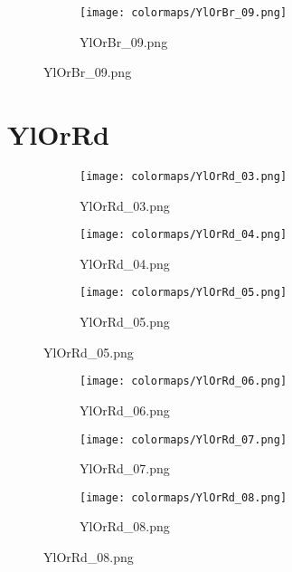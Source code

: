 \documentclass{article}%
\begin{document}
%
\hspace{1cm}\hfill%


\begin{figure}[h!]%
\begin{subfigure}[b]{0.3\linewidth}%
\texttt{[image: colormaps/YlOrBr\_09.png]}%
\caption{YlOrBr\_09.png}%
\end{subfigure}%
\end{figure}

%
\newpage%
\section{YlOrRd}%
\label{sec:YlOrRd}%
\hspace{1cm}\hfill%
\hspace{1cm}\hfill%
\hspace{1cm}\hfill%


\begin{figure}[h!]%
\begin{subfigure}[b]{0.3\linewidth}%
\texttt{[image: colormaps/YlOrRd\_03.png]}%
\caption{YlOrRd\_03.png}%
\end{subfigure}%
\begin{subfigure}[b]{0.3\linewidth}%
\texttt{[image: colormaps/YlOrRd\_04.png]}%
\caption{YlOrRd\_04.png}%
\end{subfigure}%
\begin{subfigure}[b]{0.3\linewidth}%
\texttt{[image: colormaps/YlOrRd\_05.png]}%
\caption{YlOrRd\_05.png}%
\end{subfigure}%
\end{figure}

%
\hspace{1cm}\hfill%
\hspace{1cm}\hfill%
\hspace{1cm}\hfill%


\begin{figure}[h!]%
\begin{subfigure}[b]{0.3\linewidth}%
\texttt{[image: colormaps/YlOrRd\_06.png]}%
\caption{YlOrRd\_06.png}%
\end{subfigure}%
\begin{subfigure}[b]{0.3\linewidth}%
\texttt{[image: colormaps/YlOrRd\_07.png]}%
\caption{YlOrRd\_07.png}%
\end{subfigure}%
\begin{subfigure}[b]{0.3\linewidth}%
\texttt{[image: colormaps/YlOrRd\_08.png]}%
\caption{YlOrRd\_08.png}%
\end{subfigure}%
\end{figure}
\end{document}
